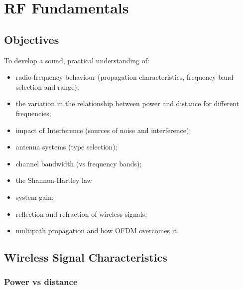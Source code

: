 \chapter{RF Fundamentals}\label{fundamentals}

\minitoc 

\clearpage
\section*{Objectives}
To develop a sound, practical understanding of:
\begin{itemize}

\item radio frequency behaviour (propagation characteristics, frequency band selection and range);

\item the variation in the relationship between power and distance for different frequencies;

\item impact of Interference (sources of noise and interference);

\item antenna systems (type selection);

\item channel bandwidth (vs frequency bands);

\item the Shannon-Hartley law
 
\item system gain; 

\item reflection and refraction of wireless signals;

\item multipath propagation and how OFDM overcomes it.

\end{itemize}


\section{Wireless Signal Characteristics}

\subsection{Power vs distance}\label{powervsdistance}

